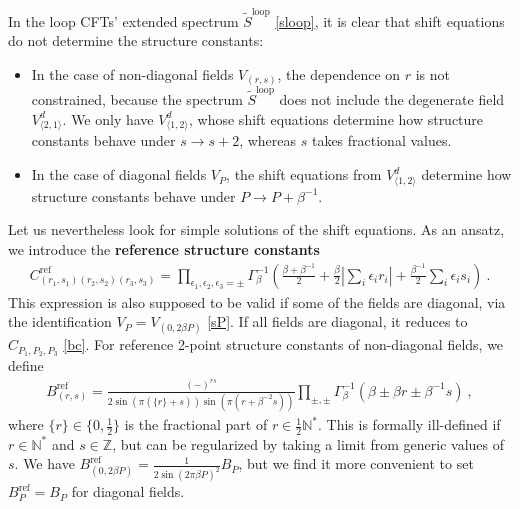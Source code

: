\documentclass[12pt, a4paper]{article}
\theoremstyle{break}
\begin{document}
In the loop CFTs' extended spectrum $\widetilde{S}^\text{loop}$ \eqref{sloop}, it is clear that shift equations do not determine the structure constants:
\begin{itemize}
 \item In the case of non-diagonal fields $V_{(r,s)}$, the dependence on $r$ is not constrained, because the spectrum $\widetilde{S}^\text{loop}$ does not include the degenerate field $V_{\langle 2,1\rangle}^d$. We only have $V^d_{\langle 1,2\rangle}$, whose shift equations determine how structure constants behave under $s\to s+2$, whereas $s$ takes fractional values.
 \item In the case of diagonal fields $V_P$, the shift equations from $V^d_{\langle 1,2\rangle}$ determine how structure constants behave under $P\to P+\beta^{-1}$. 
\end{itemize}
Let us nevertheless look for simple solutions of the shift equations. As an ansatz, we introduce the \textbf{reference structure constants} 
\begin{align}
\boxed{C^\text{ref}_{(r_1,s_1)(r_2,s_2)(r_3,s_3)} =\prod_{\epsilon_1,\epsilon_2,\epsilon_3=\pm} \Gamma_\beta^{-1} \left(\tfrac{\beta+\beta^{-1}}{2} + \tfrac{\beta}{2}\left|\textstyle{\sum_i} \epsilon_ir_i\right| + \tfrac{\beta^{-1}}{2}\textstyle{\sum_i} \epsilon_is_i\right)}\ .
 \label{cref}
\end{align}
This expression is also supposed to be valid if some of the fields are diagonal, via the identification $V_P = V_{(0,2\beta P)}$ \eqref{sP}. If all fields are diagonal, it reduces to $C_{P_1,P_2,P_3}$ \eqref{bc}. For reference 2-point structure constants of non-diagonal fields, we define 
\begin{align}
 \boxed{B^\text{ref}_{(r,s)} = \frac{(-)^{rs}}{2\sin\left(\pi(\{r\}+s)\right)\sin\left(\pi(r+\beta^{-2}s)\right)}\prod_{\pm,\pm}\Gamma_\beta^{-1}\left(\beta\pm \beta r \pm \beta^{-1}s\right)} \ ,
 \label{bref}
 \end{align}
 where $\{r\}\in\{0,\frac12\}$ is the fractional part of $r\in\frac12\mathbb{N}^*$. This is formally ill-defined if $r\in\mathbb{N}^*$ and $s\in\mathbb{Z}$, but can be regularized by taking a limit from generic values of $s$. We have $B^\text{ref}_{(0,2\beta P)} = \frac{1}{2\sin(2\pi\beta P)^2}B_P$, but we find it more convenient to set $B^\text{ref}_P = B_P$ for diagonal fields.
\end{document}
